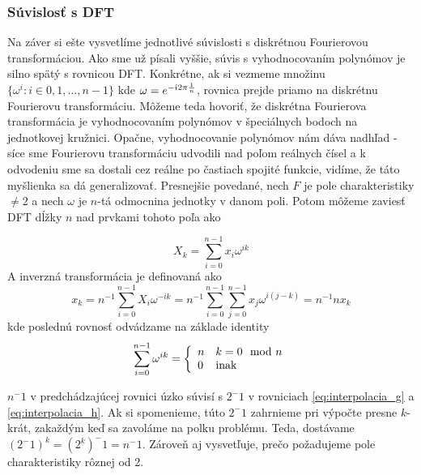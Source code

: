 \subsubsection{Súvislosť s DFT}
Na záver si ešte vysvetlíme jednotlivé súvislosti s diskrétnou
Fourierovou transformáciou. Ako sme už písali vyššie, súvis
s vyhodnocovaním polynómov je silno spätý s rovnicou DFT.
Konkrétne, ak si vezmeme množinu 
$\{ \omega^i: i \in 0,1,\dots,n-1\}$ kde $\omega = e^{-\hat{\imath} 2 \pi
\frac{1}{n}}$, rovnica  prejde priamo na diskrétnu Fourierovu
transformáciu. Môžeme teda hovoriť, že diskrétna Fourierova
transformácia je vyhodnocovaním polynómov v špeciálnych bodoch na
jednotkovej kružnici. Opačne, vyhodnocovanie polynómov nám dáva
nadhľad - síce sme Fourierovu transformáciu udvodili nad poľom
reálnych čísel a k odvodeniu sme sa dostali cez reálne po častiach
spojité funkcie, vidíme, že táto myšlienka sa dá generalizovať.
Presnejšie povedané, nech $F$ je pole charakteristiky $\not=2$ a nech
$\omega$ je $n$-tá odmocnina jednotky v danom poli.
Potom môžeme zaviesť DFT dĺžky $n$ nad prvkami tohoto poľa ako

\begin{equation}
    X_k = \sum_{i=0}^{n-1} x_i \omega^{ik}
\end{equation}
A inverzná transformácia je definovaná ako
\begin{equation}
    x_k = n^{-1} \sum_{i=0}^{n-1} X_i \omega^{-ik}
        = n^{-1} \sum_{i=0}^{n-1} \sum_{j=0}^{n-1} 
            x_j \omega^{i(j-k)}
        = n^{-1} n x_k
\end{equation}
kde poslednú rovnosť odvádzame na základe identity
\begin{equation}
    \sum_{i=0}^{n-1} \omega^{ik} = \left\{
        \begin{array}{l l}
            n& k=0 \mod n\\
            0& \text{inak}
        \end{array}
        \right.
\end{equation}
\begin{poznamka}
    $n^-1$ v predchádzajúcej rovnici úzko súvisí s $2^-1$ v rovniciach
    \ref{eq:interpolacia_g} a \ref{eq:interpolacia_h}. Ak si
    spomenieme, túto $2^-1$ zahrnieme pri výpočte presne $k$-krát,
    zakaždým keď sa zavoláme na polku problému. Teda, dostávame
    $(2^-1)^k = (2^k)^-1 = n^-1$. Zároveň aj vysvetľuje, prečo
    požadujeme pole charakteristiky rôznej od 2.
\end{poznamka}

